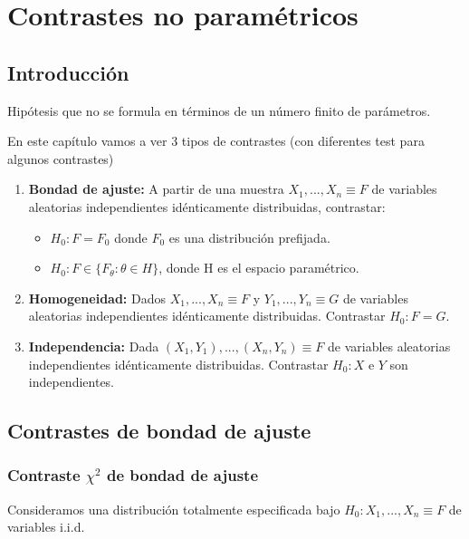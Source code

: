 \chapter{Contrastes no paramétricos}
\section{Introducción}
\begin{defn}
Hipótesis que no se formula en términos de un número finito de parámetros.\end{defn}

En este capítulo vamos a ver 3 tipos de contrastes (con diferentes test para algunos contrastes)
\begin{enumerate}
\item \textbf{Bondad de ajuste:} A partir de una muestra $X_1,...,X_n \equiv F$ de variables aleatorias independientes idénticamente distribuidas, contrastar:
\begin{itemize}
\item $H_0: F=F_0$ donde $F_0$ es una distribución prefijada.
\item $H_0: F \in \{F_{\theta} : {\theta}\in H\}$, donde H es el espacio paramétrico.
\end{itemize}
\item \textbf{Homogeneidad:} Dados $X_1,...,X_n \equiv F$ y $Y_1,...,Y_n \equiv G$ de variables aleatorias independientes idénticamente distribuidas. Contrastar $H_0: F=G$.
\item \textbf{Independencia:} Dada $(X_1,Y_1),...,(X_n,Y_n) \equiv F$ de variables aleatorias independientes idénticamente distribuidas. Contrastar $H_0: X$ e $Y$ son independientes.
\end{enumerate}



\section{Contrastes de bondad de ajuste}

\subsection{Contraste $\chi^2$ de bondad de ajuste}
Consideramos una distribución totalmente especificada bajo $H_0: X_1,...,X_n \equiv F$ de variables i.i.d.

